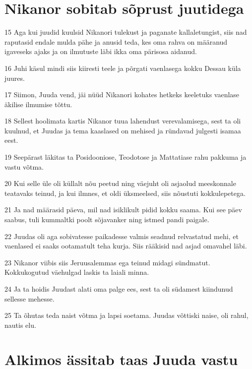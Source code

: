 \section*{Nikanor sobitab sõprust juutidega}

\par 15 Aga kui juudid kuulsid Nikanori tulekust ja paganate kallaletungist, siis nad raputasid endale mulda pähe ja anusid teda, kes oma rahva on määranud igaveseks ajaks ja on ilmutuste läbi ikka oma pärisosa aidanud.
\par 16 Juhi käsul mindi siis kiiresti teele ja põrgati vaenlasega kokku Dessau küla juures.
\par 17 Siimon, Juuda vend, jäi nüüd Nikanori kohates hetkeks keeletuks vaenlase äkilise ilmumise tõttu.
\par 18 Sellest hoolimata kartis Nikanor tuua lahendust verevalamisega, sest ta oli kuulnud, et Juudas ja tema kaaslased on mehised ja ründavad julgesti isamaa eest.
\par 19 Seepärast läkitas ta Posidooniose, Teodotose ja Mattatiase rahu pakkuma ja vastu võtma.
\par 20 Kui selle üle oli küllalt nõu peetud ning väejuht oli asjaolud meeskonnale teatavaks teinud, ja kui ilmnes, et oldi üksmeelsed, siis nõustuti kokkulepetega.
\par 21 Ja nad määrasid päeva, mil nad isiklikult pidid kokku saama. Kui see päev saabus, tuli kummaltki poolt sõjavanker ning istmed pandi paigale.
\par 22 Juudas oli aga sobivatesse paikadesse valmis seadnud relvastatud mehi, et vaenlased ei saaks ootamatult teha kurja. Siis rääkisid nad asjad omavahel läbi.
\par 23 Nikanor viibis siis Jeruusalemmas ega teinud midagi sündmatut. Kokkukogutud väehulgad laskis ta laiali minna.
\par 24 Ja ta hoidis Juudast alati oma palge ees, sest ta oli südamest kiindunud sellesse mehesse.
\par 25 Ta õhutas teda naist võtma ja lapsi soetama. Juudas võttiski naise, oli rahul, nautis elu.


\section*{Alkimos ässitab taas Juuda vastu}

